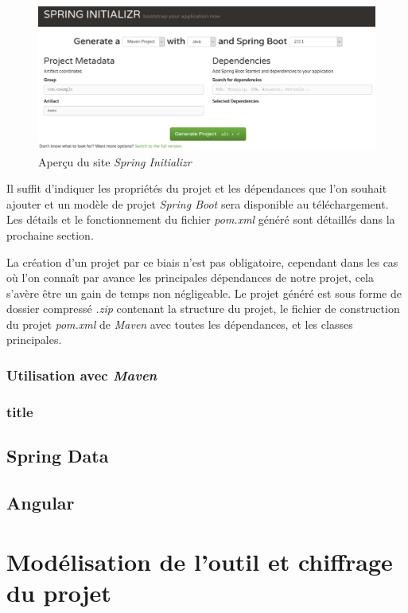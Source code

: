 \documentclass{polytech/polytech}
\begin{document}
\begin{figure}
	\includegraphics[scale=0.5]{images/springInitializr}
	\caption{Aperçu du site \textit{Spring Initializr}}
	\label{fig:initializr}
\end{figure}

Il suffit d’indiquer les propriétés du projet et les dépendances que l’on souhait ajouter et un modèle de projet \textit{Spring Boot} sera disponible au téléchargement. Les détails et le fonctionnement du fichier \textit{pom.xml} généré sont détaillés dans la prochaine section. 

La création d'un projet par ce biais n'est pas obligatoire, cependant dans les cas où l'on connaît par avance les principales dépendances de notre projet, cela s'avère être un gain de temps non négligeable. Le projet généré est sous forme de dossier compressé \textit{.zip} contenant la structure du projet, le fichier de construction du projet \textit{pom.xml} de \textit{Maven} avec toutes les dépendances, et les classes principales. 


\section{Utilisation avec \textit{Maven}}

\section{title}

\chapter{Spring Data}


\chapter{Angular}


\part{Modélisation de l'outil et chiffrage du projet}
\end{document}
